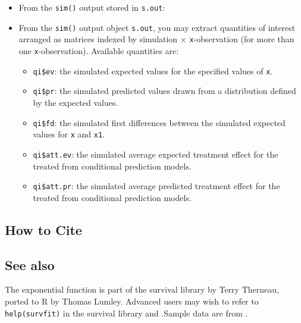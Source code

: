 \begin{itemize}
\item From the {\tt sim()} output stored in {\tt s.out}:
  
\item From the {\tt sim()} output object {\tt s.out}, you may extract
  quantities of interest arranged as matrices indexed by simulation
  $\times$ {\tt x}-observation (for more than one {\tt x}-observation).
  Available quantities are:

   \begin{itemize}
   \item {\tt qi\$ev}: the simulated expected values for the specified
     values of {\tt x}.
   \item {\tt qi\$pr}: the simulated predicted values drawn from a
     distribution defined by the expected values.
   \item {\tt qi\$fd}: the simulated first differences between the
     simulated expected values for {\tt x} and {\tt x1}.
   \item {\tt qi\$att.ev}: the simulated average expected treatment
     effect for the treated from conditional prediction models.  
   \item {\tt qi\$att.pr}: the simulated average predicted treatment
     effect for the treated from conditional prediction models.  
   \end{itemize}
\end{itemize}



\subsection* {How to Cite} 



\subsection* {See also}
The exponential function is part of the survival library by Terry
Therneau, ported to R by Thomas Lumley.  Advanced users may wish to
refer to \texttt{help(survfit)} in the survival library and \cite{VenRip02}.Sample
data are from \cite{KinAltBur90}.
